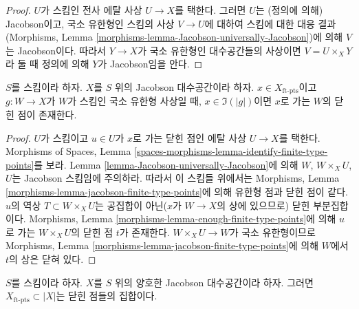 \begin{proof}
$U$가 스킴인 전사 에탈 사상 $U \to X$를 택한다.
그러면 $U$는 (정의에 의해) Jacobson이고, 국소 유한형인 스킴의 사상
$V \to U$에 대하여 스킴에 대한 대응 결과(Morphisms, Lemma
\ref{morphisms-lemma-Jacobson-universally-Jacobson})에 의해 $V$는
Jacobson이다. 따라서 $Y \to X$가 국소 유한형인 대수공간들의 사상이면
$V = U \times_X Y$라 둘 때 정의에 의해 $Y$가 Jacobson임을 안다.
\end{proof}

\begin{lemma}
\label{lemma-Jacobson-ft-points-lift-to-closed}
$S$를 스킴이라 하자. $X$를 $S$ 위의 Jacobson 대수공간이라 하자.
$x \in X_{\text{ft-pts}}$이고 $g : W \to X$가 $W$가 스킴인 국소
유한형 사상일 때, $x \in \Im(|g|)$이면 $x$로 가는 $W$의 닫힌 점이
존재한다.
\end{lemma}

\begin{proof}
$U$가 스킴이고 $u \in U$가 $x$로 가는 닫힌 점인 에탈 사상
$U \to X$를 택한다. Morphisms of Spaces, Lemma
\ref{spaces-morphisms-lemma-identify-finite-type-points}를 보라.
Lemma \ref{lemma-Jacobson-universally-Jacobson}에 의해 $W$,
$W \times_X U$, $U$는 Jacobson 스킴임에 주의하라. 따라서 이
스킴들 위에서는 Morphisms, Lemma
\ref{morphisms-lemma-jacobson-finite-type-points}에 의해 유한형 점과
닫힌 점이 같다. $u$의 역상 $T \subset W \times_X U$는
공집합이 아닌($x$가 $W \to X$의 상에 있으므로) 닫힌 부분집합이다.
Morphisms, Lemma \ref{morphisms-lemma-enough-finite-type-points}에 의해
$u$로 가는 $W \times_X U$의 닫힌 점 $t$가 존재한다.
$W \times_X U \to W$가 국소 유한형이므로 Morphisms, Lemma
\ref{morphisms-lemma-jacobson-finite-type-points}에 의해 $W$에서
$t$의 상은 닫혀 있다.
\end{proof}

\begin{lemma}
\label{lemma-decent-Jacobson-ft-pts}
$S$를 스킴이라 하자. $X$를 $S$ 위의 양호한 Jacobson 대수공간이라
하자. 그러면 $X_{\text{ft-pts}} \subset |X|$는 닫힌 점들의 집합이다.
\end{lemma}

